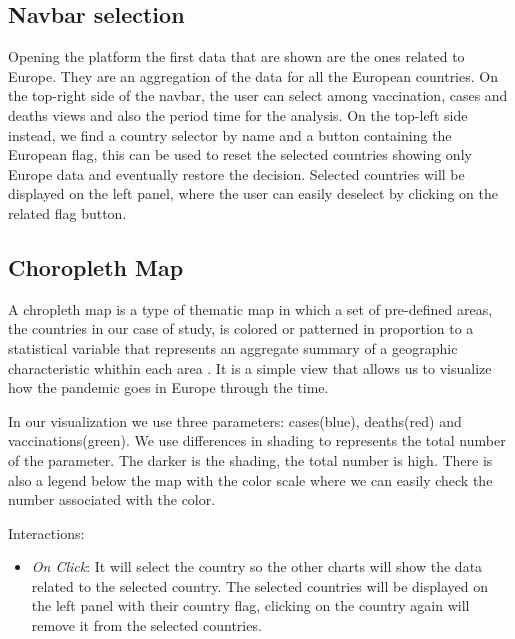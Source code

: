 \documentclass[10pt,conference]{IEEEtran}
\begin{document}
\subsection{Navbar selection}
Opening the platform the first data that are shown are the ones related to Europe. They are an aggregation of the data for all the European countries.
On the top-right side of the navbar, the user can select among vaccination, cases and deaths views and also the period time for the analysis. On the top-left side instead, we find a country selector by name and a button containing the European flag, this can be used to reset the selected countries showing only Europe data and eventually restore the decision. Selected countries will be displayed on the left panel, where the user can easily deselect by clicking on the related flag button.

\subsection{Choropleth Map}
A chropleth map is a type of thematic map in which a set of pre-defined areas, the countries in our case of study, is colored or patterned in proportion to a statistical variable that represents an aggregate summary of a geographic characteristic whithin each area \cite{map}. It is a simple view that allows us to visualize how the pandemic goes in Europe through the time. 

In our visualization we use three parameters: cases(blue), deaths(red) and vaccinations(green). We use differences in shading to represents the total number of the parameter. The darker is the shading, the total number is high. There is also a legend below the map with the color scale where we can easily check the number associated with the color.

Interactions:
\begin{itemize}
	\item {\em On Click}: It will select the country so the other charts will show the data related to the selected country. The selected countries will be displayed on the left panel with their country flag, clicking on the country again will remove it from the selected countries.
\end{itemize}
\end{document}
